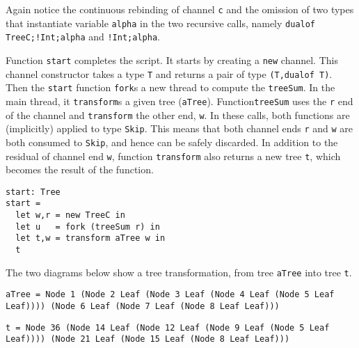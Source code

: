 Again notice the continuous rebinding of channel \lstinline|c| and the
omission of two types that instantiate variable \lstinline|alpha| in
the two recursive calls, namely \lstinline|dualof TreeC;!Int;alpha|
and \lstinline|!Int;alpha|.

Function \lstinline|start| completes the script. It starts by creating
a \lstinline|new| channel. This channel constructor takes a type
\lstinline|T| and returns a pair of type
%
\lstinline|(T,dualof T)|. Then the \lstinline|start| function
\lstinline|fork|s a new thread to compute the \lstinline|treeSum|. In
the main thread, it \lstinline|transform|s a given tree
(\lstinline|aTree|). Function\lstinline|treeSum| uses the
\lstinline|r| end of the channel and \lstinline|transform| the other
end, \lstinline|w|. In these calls, both functions are (implicitly)
applied to type \lstinline|Skip|. This means that both channel ends
\lstinline|r| and \lstinline|w| are both consumed to \lstinline|Skip|,
and hence can be safely discarded. In addition to the residual of
channel end \lstinline|w|, function \lstinline|transform| also returns
a new tree \lstinline|t|, which becomes the result of the function.
%
\begin{lstlisting}
start: Tree
start =
  let w,r = new TreeC in
  let u   = fork (treeSum r) in
  let t,w = transform aTree w in
  t
\end{lstlisting}

The two diagrams below show a tree transformation, from tree
\lstinline|aTree| into tree \lstinline|t|. 

\begin{lstlisting}
aTree = Node 1 (Node 2 Leaf (Node 3 Leaf (Node 4 Leaf (Node 5 Leaf Leaf)))) (Node 6 Leaf (Node 7 Leaf (Node 8 Leaf Leaf)))
\end{lstlisting}

\begin{lstlisting}
t = Node 36 (Node 14 Leaf (Node 12 Leaf (Node 9 Leaf (Node 5 Leaf Leaf)))) (Node 21 Leaf (Node 15 Leaf (Node 8 Leaf Leaf)))
\end{lstlisting}



